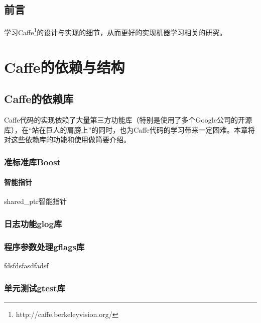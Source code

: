 \documentclass{../CNTeXBookTemplate/NanCNBook}
\title{\hei\chuhao{Caffe\cite{jia2014caffe}解析}}
\author{nannanmath}
\begin{document}
\maketitle{}
\thispagestyle{empty}

\frontmatter
\pagestyle{plain}
\chapter*{前{\quad}言}
学习Caffe\footnote{http://caffe.berkeleyvision.org/}的设计与实现的细节，从而更好的实现机器学习相关的研究。



\tableofcontents
\listoffigures
\listoftables


\mainmatter
\pagestyle{fancy}

\part{Caffe的依赖与结构}




\chapter{Caffe的依赖库}
Caffe代码的实现依赖了大量第三方功能库（特别是使用了多个Google公司的开源库），在“站在巨人的肩膀上”的同时，也为Caffe代码的学习带来一定困难。本章将对这些依赖库的功能和使用做简要介绍。
\section{准标准库Boost}
\subsection{智能指针}\label{deps/boost/pointer}
shared\_ptr智能指针
\section{日志功能glog库}\label{deps/glog}

\section{程序参数处理gflags库}\label{deps/gflags}
fdsfdsfasdfadsf
\section{单元测试gtest库}
\end{document}
